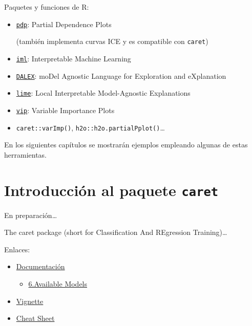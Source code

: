 \documentclass[]{book}
\providecommand{\tightlist}{%
  \setlength{\itemsep}{0pt}\setlength{\parskip}{0pt}}
\theoremstyle{break}
\theoremstyle{definition}
\theoremstyle{definition}
\theoremstyle{definition}
\theoremstyle{remark}
\begin{document}
Paquetes y funciones de R:

\begin{itemize}
\item
  \href{https://bgreenwell.github.io/pdp/index.html}{\texttt{pdp}}:
  Partial Dependence Plots

  (también implementa curvas ICE y es compatible con \texttt{caret})
\item
  \href{https://christophm.github.io/iml}{\texttt{iml}}: Interpretable
  Machine Learning
\item
  \href{https://modeloriented.github.io/DALEX}{\texttt{DALEX}}: moDel
  Agnostic Language for Exploration and eXplanation
\item
  \href{https://lime.data-imaginist.com}{\texttt{lime}}: Local
  Interpretable Model-Agnostic Explanations
\item
  \href{https://koalaverse.github.io/vip/index.html}{\texttt{vip}}:
  Variable Importance Plots
\item
  \texttt{caret::varImp()}, \texttt{h2o::h2o.partialPplot()}\ldots{}
\end{itemize}

En los siguientes capítulos se mostrarán ejemplos empleando algunas de
estas herramientas.

\section{\texorpdfstring{Introducción al paquete
\texttt{caret}}{Introducción al paquete caret}}\label{caret}

En preparación\ldots{}

The caret package (short for Classification And REgression
Training)\ldots{}

Enlaces:

\begin{itemize}
\item
  \href{https://topepo.github.io/caret}{Documentación}

  \begin{itemize}
  \tightlist
  \item
    \href{https://topepo.github.io/caret/available-models.html}{6.Available
    Models}
  \end{itemize}
\item
  \href{https://cran.r-project.org/web/packages/caret/vignettes/caret.html}{Vignette}
\item
  \href{https://raw.githubusercontent.com/rstudio/cheatsheets/master/caret.pdf}{Cheat
  Sheet}
\end{itemize}
\end{document}
